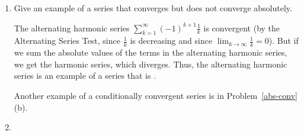 \documentclass[main]{subfiles}
\begin{document}
\begin{enumerate}
\begin{enumerate}
\end{enumerate}


\begin{problemonly}
\begin{framed}
\textbf{Definition.}  A series $\sum a_k$ is called \uline{absolutely
convergent} if the series of absolute values $\sum |a_k|$ is
convergent.

\textbf{Theorem.}  If a series $\sum a_k$ is absolutely convergent,
then it is convergent.

The opposite (converse) of the theorem is not true: there are
convergent series which are not absolutely convergent.  These series
are called \uline{conditionally convergent}.
\end{framed}
\end{problemonly}



\item 
\begin{problem}[1in]
  Give an example of a series that converges but does not converge absolutely.
\end{problem}

\begin{solution} 
  The alternating harmonic series $\displaystyle \sum_{k=1}^{\infty} (-1)^{k+1}\frac{1}{k}$ is 
  convergent (by the Alternating Series Test, since $\displaystyle \frac{1}{k}$ is decreasing 
  and since $\displaystyle\lim_{k\rightarrow \infty} \frac{1}{k} = 0$).  But if we sum the 
  absolute values of the terms in the alternating harmonic series, we 
  get the harmonic series, which diverges.  Thus, the alternating harmonic series is an 
  example of a series that is .
  
  Another example of a conditionally convergent series is in Problem~\ref{abs-conv}(b).
\end{solution}

\pspace{\newpage}


\item \label{abs-conv}




\end{enumerate}
\end{document}
